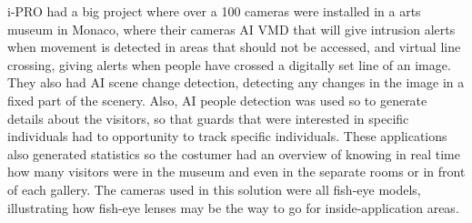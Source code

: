 i-PRO had a big project where over a 100 cameras were installed in a arts museum in Monaco, where their cameras AI VMD that will give intrusion alerts when movement is detected in areas that should not be accessed, and virtual line crossing, giving alerts when people have crossed a digitally set line of an image. They also had AI scene change detection, detecting any changes in the image in a fixed part of the scenery. Also, AI people detection was used so to generate details about the visitors, so that guards that were interested in specific individuals had to opportunity to track specific individuals. These applications also generated statistics so the costumer had an overview of knowing in real time how many visitors were in the museum and even in the separate rooms or in front of each gallery. The cameras used in this solution were all fish-eye models, illustrating how fish-eye lenses may be the way to go for inside-application areas. 

